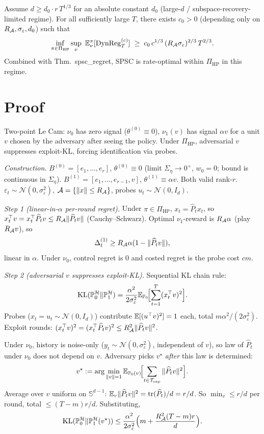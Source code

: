 \begin{theorem}
\label{thm:spsc_lb}
Assume $d \ge d_0\cdot r\,T^{1/3}$ for an absolute constant $d_0$
(large-$d$ / subspace-recovery-limited regime). For all sufficiently
large $T$, there exists $c_0 > 0$ (depending only on
$R_{\mathcal{A}}, \sigma_\varepsilon, d_0$) such that
\[
\inf_{\pi\in\Pi_{\mathrm{HP}}} \sup_\nu\ \E^\pi_\nu[\DynReg_T^{(c)}]
 \;\ge\; c_0\,c^{1/3}\,(R_\cA\sigma_\varepsilon)^{2/3}\,T^{2/3}.
\]
Combined with Thm.\ spsc\_regret, SPSC is rate-optimal within
$\Pi_{\mathrm{HP}}$ in this regime.
\end{theorem}

\section*{Proof}

Two-point Le Cam: $\nu_0$ has zero signal ($\theta^{(0)}\equiv 0$),
$\nu_1(v)$ has signal $\alpha v$ for a unit $v$ chosen by the
adversary after seeing the policy. Under $\Pi_{\mathrm{HP}}$,
adversarial $v$ suppresses exploit-KL, forcing identification via
probes.

\emph{Construction.} $B^{(0)}=[e_1,\dots,e_r]$, $\theta^{(0)}\equiv 0$
(limit $\Sigma_\eta\to 0^+$, $w_0=0$; bound is continuous in $\Sigma_\eta$).
$B^{(1)}=[e_1,\dots,e_{r-1},v]$, $\theta^{(1)}\equiv\alpha v$. Both
valid rank-$r$. $\varepsilon_t\sim\mathcal N(0,\sigma_\varepsilon^2)$,
$\mathcal{A}=\{\|x\|\le R_{\mathcal{A}}\}$, probes $u_t\sim\mathcal N(0,I_d)$.

\emph{Step 1 (linear-in-$\alpha$ per-round regret).} Under $\pi\in\Pi_{\mathrm{HP}}$,
$x_t=\widehat P_t x_t$, so $x_t^\top v = x_t^\top\widehat P_t v\le R_{\mathcal{A}}\|\widehat P_t v\|$
(Cauchy--Schwarz). Optimal $\nu_1$-reward is $R_{\mathcal{A}}\alpha$ (play $R_{\mathcal{A}} v$),
so
\[
\Delta_t^{(1)}\ge R_{\mathcal{A}}\alpha(1-\|\widehat P_t v\|),
\]
linear in $\alpha$. Under $\nu_0$, control regret is $0$ and costed
regret is the probe cost $cm$.

\emph{Step 2 (adversarial $v$ suppresses exploit-KL).} Sequential KL
chain rule:
\[
\mathrm{KL}(\mathbb P_0^{\mathcal{H}}\|\mathbb P_1^{\mathcal{H}})
=\frac{\alpha^2}{2\sigma_\varepsilon^2}\mathbb{E}_{\mathbb P_0}\!\Bigl[\sum_{t=1}^T(x_t^\top v)^2\Bigr].
\]
Probes ($x_t=u_t\sim\mathcal N(0,I_d)$) contribute $\mathbb{E}[(u^\top v)^2]=1$
each, total $m\alpha^2/(2\sigma_\varepsilon^2)$. Exploit rounds:
$(x_t^\top v)^2=(x_t^\top\widehat P_t v)^2\le R_{\mathcal{A}}^2\|\widehat P_t v\|^2$.

Under $\nu_0$, history is noise-only ($y_t\sim\mathcal N(0,\sigma_\varepsilon^2)$,
independent of $v$), so law of $\widehat P_t$ under $\nu_0$ does not
depend on $v$. Adversary picks $v^\star$ \emph{after} this law is
determined:
\[
v^\star:=\arg\min_{\|v\|=1}\mathbb{E}_{\mathbb P_0(v)}\!\Bigl[\sum_{t\in\mathcal{T}_{\mathrm{exp}}}\|\widehat P_t v\|^2\Bigr].
\]
Average over $v$ uniform on $\mathbb S^{d-1}$: $\mathbb{E}_v\|\widehat P_t v\|^2=\operatorname{tr}(\widehat P_t)/d=r/d$.
So $\min_v\le r/d$ per round, total $\le(T-m)r/d$. Substituting,
\[
\mathrm{KL}(\mathbb P_0^{\mathcal{H}}\|\mathbb P_1^{\mathcal{H}}(v^\star))
\le\frac{\alpha^2}{2\sigma_\varepsilon^2}\Bigl(m+\frac{R_{\mathcal{A}}^2(T-m)r}{d}\Bigr).
\]

